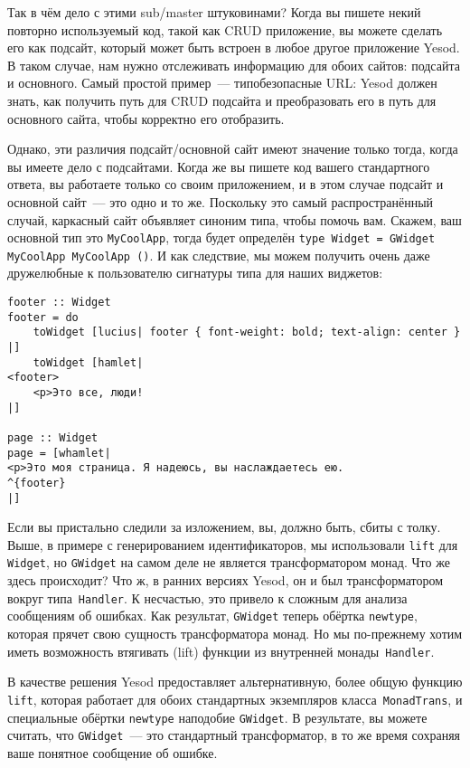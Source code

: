 Так в чём дело с этими sub/master штуковинами? Когда вы пишете некий повторно
используемый код, такой как CRUD приложение, вы можете сделать его как подсайт,
который может быть встроен в любое другое приложение Yesod. В таком случае, нам
нужно отслеживать информацию для обоих сайтов: подсайта и основного. Самый
простой пример~--- типобезопасные URL: Yesod должен знать, как получить путь
для CRUD подсайта и преобразовать его в путь для основного сайта, чтобы
корректно его отобразить.

Однако, эти различия подсайт/основной сайт имеют значение только тогда, когда
вы имеете дело с подсайтами. Когда же вы пишете код вашего стандартного ответа,
вы работаете только со своим приложением, и в этом случае подсайт и основной
сайт~--- это одно и то же. Поскольку это самый распространённый случай,
каркасный сайт объявляет синоним типа, чтобы помочь вам. Скажем, ваш основной
тип это \lstinline'MyCoolApp', тогда будет определён
\lstinline'type Widget = GWidget MyCoolApp MyCoolApp ()'.
И как следствие, мы можем получить очень даже дружелюбные к пользователю
сигнатуры типа для наших виджетов:
\begin{lstlisting}
footer :: Widget
footer = do
    toWidget [lucius| footer { font-weight: bold; text-align: center } |]
    toWidget [hamlet|
<footer>
    <p>Это все, люди!
|]

page :: Widget
page = [whamlet|
<p>Это моя страница. Я надеюсь, вы наслаждаетесь ею.
^{footer}
|]
\end{lstlisting}

Если вы пристально следили за изложением, вы, должно быть, сбиты с толку. Выше,
в примере с генерированием идентификаторов, мы использовали \lstinline'lift'
для \lstinline'Widget', но \lstinline'GWidget' на самом деле не является
трансформатором монад. Что же здесь происходит? Что ж, в ранних версиях Yesod,
он и был трансформатором вокруг типа~\lstinline'Handler'. К несчастью, это
привело к сложным для анализа сообщениям об ошибках. Как результат,
\lstinline'GWidget' теперь обёртка \lstinline'newtype', которая прячет свою
сущность трансформатора монад. Но мы по-прежнему хотим иметь возможность
втягивать (lift) функции из внутренней монады~\lstinline'Handler'.

В качестве решения Yesod предоставляет альтернативную, более общую функцию
\lstinline'lift', которая работает для обоих стандартных экземпляров
класса~\lstinline'MonadTrans', и специальные обёртки \lstinline'newtype'
наподобие \lstinline'GWidget'.  В результате, вы можете считать, что
\lstinline'GWidget'~--- это стандартный трансформатор, в то же время сохраняя
ваше понятное сообщение об ошибке.


